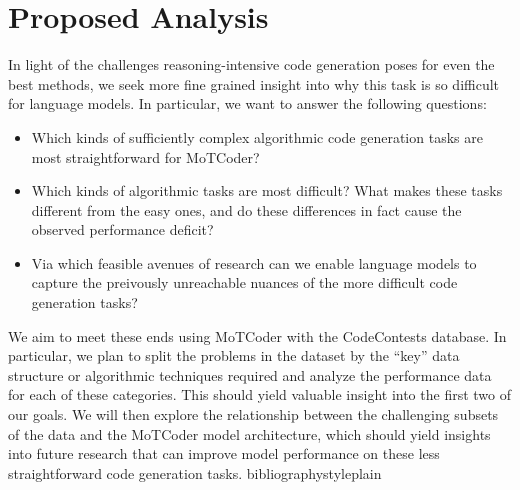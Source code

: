\documentclass[10pt]{article}
\theoremstyle{definition}
\begin{document}
\section{Proposed Analysis}
\noindent In light of the challenges reasoning-intensive code generation poses for even the best methods, we seek more fine grained insight into why this task is so difficult for language models. In particular, we want to answer the following questions:
\begin{itemize}
    \item Which kinds of sufficiently complex algorithmic code generation tasks are most straightforward for MoTCoder?
    \item Which kinds of algorithmic tasks are most difficult? What makes these tasks different from the easy ones, and do these differences in fact cause the observed performance deficit?
    \item Via which feasible avenues of research can we enable language models to capture the preivously unreachable nuances of the more difficult code generation tasks? 
\end{itemize}
\noindent We aim to meet these ends using MoTCoder with the CodeContests database. In particular, we plan to split the problems in the dataset by the ``key'' data structure or algorithmic techniques required and analyze the performance data for each of these categories. This should yield valuable insight into the first two of our goals. We will then explore the relationship between the challenging subsets of the data and the MoTCoder model architecture, which should yield insights into future research that can improve model performance on these less straightforward code generation tasks.
bibliographystyle{plain}

\end{document}
